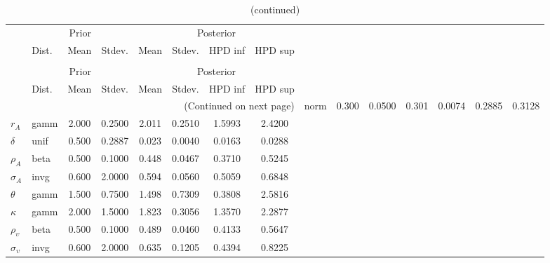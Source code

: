  
\begin{center}
\begin{longtable}{llcccccc} 
\caption{Results from Metropolis-Hastings (parameters)}
 \label{Table:MHPosterior:1}\\
\toprule 
  & \multicolumn{3}{c}{Prior}  &  \multicolumn{4}{c}{Posterior} \\
  \cmidrule(r{.75em}){2-4} \cmidrule(r{.75em}){5-8}
  & Dist. & Mean  & Stdev. & Mean & Stdev. & HPD inf & HPD sup\\
\midrule \endfirsthead 
\caption{(continued)}\\\toprule 
  & \multicolumn{3}{c}{Prior}  &  \multicolumn{4}{c}{Posterior} \\
  \cmidrule(r{.75em}){2-4} \cmidrule(r{.75em}){5-8}
  & Dist. & Mean  & Stdev. & Mean & Stdev. & HPD inf & HPD sup\\
\midrule \endhead 
\bottomrule \multicolumn{8}{r}{(Continued on next page)} \endfoot 
\bottomrule \endlastfoot 
${\alpha}$ & norm &   0.300 & 0.0500 &   0.301& 0.0074 &  0.2885 &  0.3128 \\ 
${r_{A}}$ & gamm &   2.000 & 0.2500 &   2.011& 0.2510 &  1.5993 &  2.4200 \\ 
${\delta}$ & unif &   0.500 & 0.2887 &   0.023& 0.0040 &  0.0163 &  0.0288 \\ 
${\rho_A}$ & beta &   0.500 & 0.1000 &   0.448& 0.0467 &  0.3710 &  0.5245 \\ 
${\sigma_A}$ & invg &   0.600 & 2.0000 &   0.594& 0.0560 &  0.5059 &  0.6848 \\ 
${\theta}$ & gamm &   1.500 & 0.7500 &   1.498& 0.7309 &  0.3808 &  2.5816 \\ 
${\kappa}$ & gamm &   2.000 & 1.5000 &   1.823& 0.3056 &  1.3570 &  2.2877 \\ 
${\rho_\upsilon}$ & beta &   0.500 & 0.1000 &   0.489& 0.0460 &  0.4133 &  0.5647 \\ 
${\sigma_\upsilon}$ & invg &   0.600 & 2.0000 &   0.635& 0.1205 &  0.4394 &  0.8225 \\ 
\end{longtable}
 \end{center}
